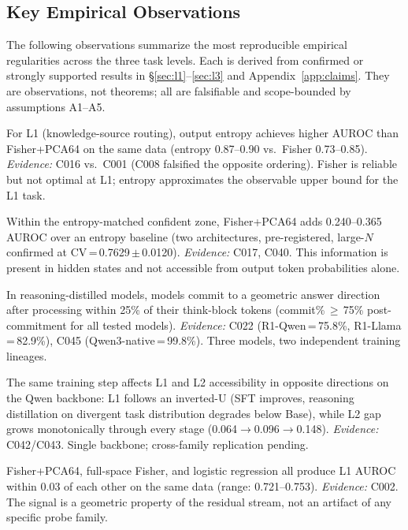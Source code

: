 \documentclass[11pt]{article}
\begin{document}
\subsection{Key Empirical Observations}
\label{sec:observations}

The following observations summarize the most reproducible empirical regularities
across the three task levels. Each is derived from confirmed or strongly supported
results in \S\ref{sec:l1}--\ref{sec:l3} and Appendix~\ref{app:claims}. They are
observations, not theorems; all are falsifiable and scope-bounded by assumptions A1--A5.

\begin{description}[leftmargin=3em, font=\normalfont\bfseries]

\item[Observation 1 (Entropy as L1 Upper Bound).]
  For L1 (knowledge-source routing), output entropy achieves higher AUROC than
  Fisher+PCA64 on the same data (entropy 0.87--0.90 vs.\ Fisher 0.73--0.85).
  \emph{Evidence:} C016 vs.\ C001 (C008 falsified the opposite ordering).
  Fisher is reliable but not optimal at L1; entropy approximates the observable upper
  bound for the L1 task.

\item[Observation 2 (L2 Signal Not in Output Distributions).]
  Within the entropy-matched confident zone, Fisher+PCA64 adds 0.240--0.365 AUROC
  over an entropy baseline (two architectures, pre-registered, large-$N$ confirmed at
  CV\,=\,0.7629\,$\pm$\,0.0120).
  \emph{Evidence:} C017, C040. This information is present in hidden states and
  not accessible from output token probabilities alone.

\item[Observation 3 (Commitment Precedes Verbalization).]
  In reasoning-distilled models, models commit to a geometric answer direction after
  processing within 25\% of their think-block tokens (commit\%\,$\geq$\,75\%
  post-commitment for all tested models).
  \emph{Evidence:} C022 (R1-Qwen\,=\,75.8\%, R1-Llama\,=\,82.9\%), C045
  (Qwen3-native\,=\,99.8\%). Three models, two independent training lineages.

\item[Observation 4 (Asymmetric Training Effects).]
  The same training step affects L1 and L2 accessibility in opposite directions on the
  Qwen backbone: L1 follows an inverted-U (SFT improves, reasoning distillation on
  divergent task distribution degrades below Base), while L2 gap grows monotonically
  through every stage (0.064$\to$0.096$\to$0.148).
  \emph{Evidence:} C042/C043. Single backbone; cross-family replication pending.

\item[Observation 5 (Estimator Convergence).]
  Fisher+PCA64, full-space Fisher, and logistic regression all produce L1 AUROC within
  0.03 of each other on the same data (range: 0.721--0.753).
  \emph{Evidence:} C002. The signal is a geometric property of the residual stream,
  not an artifact of any specific probe family.

\end{description}
\end{document}
